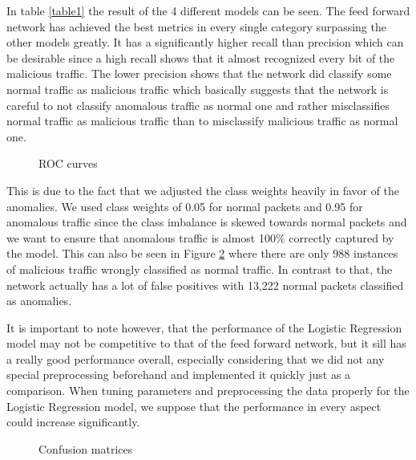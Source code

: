 \documentclass[]{article}
\begin{document}
	\noindent
	In table \ref{table1} the result of the 4 different models can be seen. The feed forward network has achieved the best metrics in every single category surpassing the other models greatly. It has a significantly higher recall than precision which can be desirable since a high recall shows that it almost recognized every bit of the malicious traffic. The lower precision shows that the network did classify some normal traffic as malicious traffic which basically suggests that the network is careful to not classify anomalous traffic as normal one and rather misclassifies normal traffic as malicious traffic than to misclassify malicious traffic as normal one.
	\begin{figure}[!tbp]
		\centering
		\hfill
		\hfill
		\caption{ROC curves}
		\label{roc}
	\end{figure}

	This is due to the fact that we adjusted the class weights heavily in favor of the anomalies. We used class weights of 0.05 for normal packets and 0.95 for anomalous traffic since the class imbalance is skewed towards normal packets and we want to ensure that anomalous traffic is almost 100\% correctly captured by the model. This can also be seen in Figure \ref{confusion} where there are only 988 instances of malicious traffic wrongly classified as normal traffic. In contrast to that, the network actually has a lot of false positives with 13,222 normal packets classified as anomalies.
	\newline
	
	\noindent
	It is important to note however, that the performance of the Logistic Regression model may not be competitive to that of the feed forward network, but it sill has a really good performance overall, especially considering that we did not any special preprocessing beforehand and implemented it quickly just as a comparison. When tuning parameters and preprocessing the data properly for the Logistic Regression model, we suppose that the performance in every aspect could increase significantly.
	\newline
	

	\begin{figure}[!tbp]
	\centering
	\hfill
	\hfill
	\caption{Confusion matrices}
	\label{confusion}
\end{figure}
\end{document}
